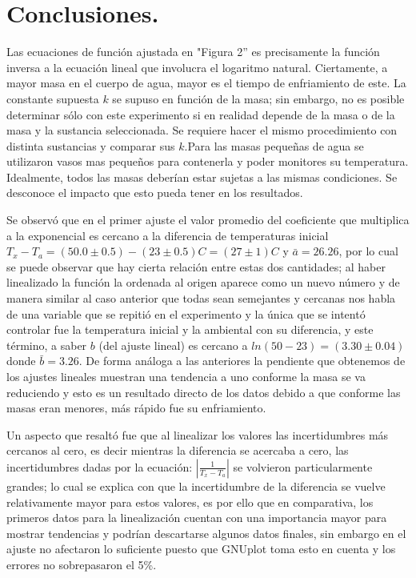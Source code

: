 \documentclass[a4paper]{article}
\begin{document}

\section{Conclusiones.}

Las ecuaciones de función ajustada en "Figura 2'' es precisamente la función inversa a la ecuación lineal que involucra el logaritmo natural. Ciertamente, a mayor masa en el cuerpo de agua, mayor es el tiempo de enfriamiento de este. La constante supuesta $k$ se supuso en función de la masa; sin embargo, no es posible determinar sólo con este experimento si en realidad depende de la masa o de la masa y la sustancia seleccionada. Se requiere hacer el mismo procedimiento con distinta sustancias y comparar sus $k$.Para las masas pequeñas de agua se utilizaron vasos mas pequeños para contenerla y poder monitores su temperatura. Idealmente, todos las masas deberían estar sujetas a las mismas condiciones. Se desconoce el impacto que esto pueda tener en los resultados.

Se observó que en el primer ajuste el valor promedio del coeficiente que multiplica a la exponencial es cercano a la diferencia de temperaturas inicial $T_x - T_a = (50.0\pm0.5) - (23\pm0.5) C = (27\pm1)C$ y $\bar{a} = 26.26$, por lo cual se puede observar que hay cierta relación entre estas dos cantidades; al haber linealizado la función la ordenada al origen aparece como un nuevo número y de manera similar al caso anterior que todas sean semejantes y cercanas nos habla de una variable que se repitió en el experimento y la única que se intentó controlar fue la temperatura inicial y la ambiental con su diferencia, y este término, a saber $b$ (del ajuste lineal) es cercano a $ln(50-23) = (3.30\pm0.04)$ donde $\bar{b} = 3.26$. De forma análoga a las anteriores la pendiente que obtenemos de los ajustes lineales muestran una tendencia a uno conforme la masa se va reduciendo y esto es un resultado directo de los datos debido a que conforme las masas eran menores, más rápido fue su enfriamiento.

Un aspecto que resaltó fue que al linealizar los valores las incertidumbres más cercanos al cero, es decir mientras la diferencia se acercaba a cero, las incertidumbres dadas por la ecuación: $\left|\frac{1}{T_x - T_a} \right|$ se volvieron particularmente grandes; lo cual se explica con que la incertidumbre de la diferencia se vuelve relativamente mayor para estos valores, es por ello que en comparativa, los primeros datos para la linealización cuentan con una importancia mayor para mostrar tendencias y podrían descartarse algunos datos finales, sin embargo en el ajuste no afectaron lo suficiente puesto que GNUplot toma esto en cuenta y los errores no sobrepasaron el 5\%.
\end{document}
